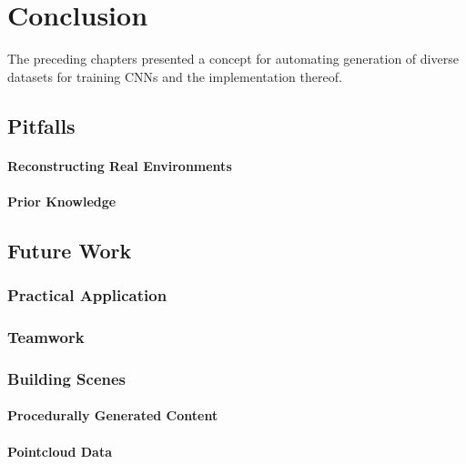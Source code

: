 \chapter{Conclusion}
The preceding chapters presented a concept for automating generation of diverse datasets for training \acp{CNN} and the implementation thereof.

\section{Pitfalls}
\subsubsection{Reconstructing Real Environments}
\subsubsection{Prior Knowledge}

\section{Future Work}
\subsection{Practical Application}

\subsection{Teamwork}

\subsection{Building Scenes}
\subsubsection{Procedurally Generated Content}

\subsubsection{Pointcloud Data}